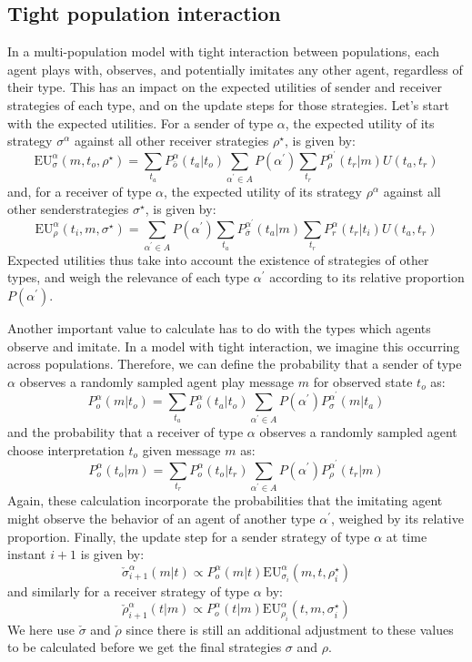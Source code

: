 \documentclass[a4paper]{article}
\begin{document}
\subsection{Tight population interaction}
\label{sec:tight-interaction-model}
In a multi-population model with tight interaction between populations, each agent plays with, observes, and potentially imitates any other agent, regardless of their type.
This has an impact on the expected utilities of sender and receiver strategies of each type, and on the update steps for those strategies.
Let's start with the expected utilities.
For a sender of type $\alpha$, the expected utility of its strategy $\sigma^\alpha$ against all other receiver strategies $\rho^\star$, is given by:
$$
\text{EU}_{\sigma}^{\alpha}(m,t_{o},\rho^{\star})=\sum_{t_{a}}P_{\bar{o}}^{\alpha}(t_{a}|t_{o})\sum_{\alpha^{\prime}\in A}P(\alpha^{\prime})\sum_{t_{r}}P_{\rho}^{\alpha^{\prime}}(t_{r}|m)U(t_{a},t_{r})
$$
and, for a receiver of type $\alpha$, the expected utility of its strategy $\rho^\alpha$ against all other senderstrategies $\sigma^\star$, is given by:
$$
\text{EU}_{\rho}^{\alpha}(t_{i},m,\sigma^{\star})=\sum_{\alpha^{\prime}\in A}P(\alpha^{\prime})\sum_{t_{a}}P_{\bar{\sigma}}^{\alpha^{\prime}}(t_{a}|m)\sum_{t_{r}}P_{r}^{\alpha}(t_{r}|t_{i})U(t_{a},t_{r})
$$
Expected utilities thus take into account the existence of strategies of other types, and weigh the relevance of each type $\alpha^\prime$ according to its relative proportion $P(\alpha^\prime)$.

Another important value to calculate has to do with the types which agents observe and imitate.
In a model with tight interaction, we imagine this occurring across populations.
Therefore, we can define the probability that a sender of type $\alpha$ observes a randomly sampled agent play message $m$ for observed state $t_o$ as:
$$
P_{o}^{\alpha}(m|t_{o})=\sum_{t_{a}}P_{\bar{o}}^{\alpha}(t_{a}|t_{o})\sum_{\alpha^{\prime}\in A}P(\alpha^{\prime})P_{\sigma}^{\alpha^{\prime}}(m|t_{a})
$$
and the probability that a receiver of type $\alpha$ observes a randomly sampled agent choose interpretation $t_o$ given message $m$ as:
$$
P_{o}^{\alpha}(t_{o}|m)=\sum_{t_{r}}P_{o}^{\alpha}(t_{o}|t_{r})\sum_{\alpha^{\prime}\in A}P(\alpha^{\prime})P_{\rho}^{\alpha^{\prime}}(t_{r}|m)
$$
Again, these calculation incorporate the probabilities that the imitating agent might observe the behavior of an agent of another type $\alpha^\prime$, weighed by its relative proportion.
%
Finally, the update step for a sender strategy of type $\alpha$ at time instant $i+1$ is given by:
$$
\check{\sigma}_{i+1}^{\alpha}(m|t) \propto P_{o}^{\alpha}(m|t)\text{EU}_{\sigma_{i}}^{\alpha}(m,t,\rho_{i}^{\star})
$$
and similarly for a receiver strategy of type $\alpha$ by:
$$
\check{\rho}_{i+1}^{\alpha}(t|m) \propto P_{o}^{\alpha}(t|m)\text{EU}_{\rho_{i}}^{\alpha}(t,m,\sigma_{i}^{\star})
$$
We here use $\check{\sigma}$ and $\check{\rho}$ since there is still an additional adjustment to these values to be calculated before we get the final strategies $\sigma$ and $\rho$.
\end{document}
